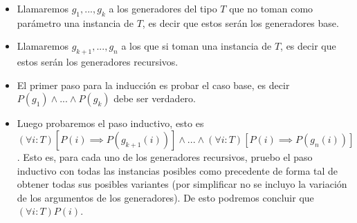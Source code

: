 \begin{itemize}
 \item Llamaremos $g_1,...,g_k$ a los generadores del tipo $T$ que no toman como par\'ametro una instancia de $T$, es decir que estos ser\'an los generadores base.
 \item Llamaremos $g_{k+1},...,g_n$ a los que si toman una instancia de $T$, es decir que estos ser\'an los generadores recursivos.
 \item El primer paso para la inducci\'on es probar el caso base, es decir $P(g_1) \land ... \land P(g_k)$ debe ser verdadero.
 \item Luego probaremos el paso inductivo, esto es $(\forall i : T) [P(i) \implies P(g_{k+1}(i))] \land ... \land (\forall i : T) [P(i) \implies P(g_{n}(i))]$. Esto es, para cada uno de los generadores recursivos, pruebo el paso inductivo con todas las instancias posibles como precedente de forma tal de obtener todas sus posibles variantes (por simplificar no se incluyo la variaci\'on de los argumentos de los generadores). De esto podremos concluir que $(\forall i : T) P(i)$.
\end{itemize}
